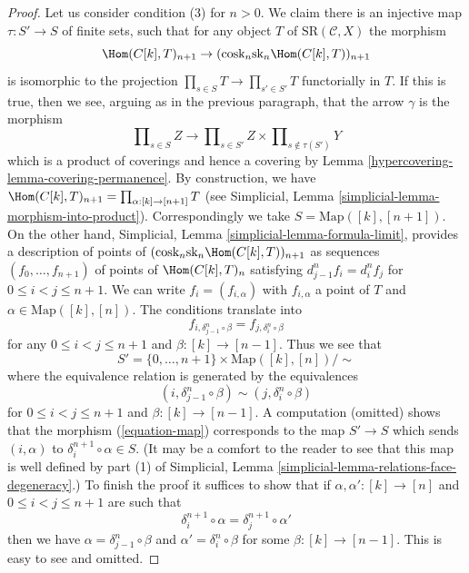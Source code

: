 \begin{proof}
\medskip\noindent
Let us consider condition (3) for $n > 0$. We claim there is an
injective map $\tau : S' \to S$ of finite sets, such that for any
object $T$ of $\text{SR}(\mathcal{C}, X)$ the morphism
\begin{equation}
\label{equation-map}
\Hom(C[k], T)_{n + 1} \to
(\text{cosk}_n \text{sk}_n \Hom(C[k], T))_{n + 1}
\end{equation}
is isomorphic to the projection $\prod_{s \in S} T \to \prod_{s' \in S'} T$
functorially in $T$. If this is true, then we see, arguing as in the previous
paragraph, that the arrow $\gamma$ is the morphism
$$
\prod\nolimits_{s \in S} Z
\longrightarrow
\prod\nolimits_{s \in S'} Z
\times
\prod\nolimits_{s \not\in \tau(S')} Y
$$
which is a product of coverings and hence a covering by
Lemma \ref{hypercovering-lemma-covering-permanence}. By construction, we have
$\Hom(C[k], T)_{n + 1} = \prod_{\alpha : [k] \to [n + 1]} T$
(see Simplicial, Lemma \ref{simplicial-lemma-morphism-into-product}).
Correspondingly we take $S = \text{Map}([k], [n + 1])$.
On the other hand, Simplicial, Lemma \ref{simplicial-lemma-formula-limit},
provides a description of points of
$(\text{cosk}_n \text{sk}_n \Hom(C[k], T))_{n + 1}$
as sequences $(f_0, \ldots, f_{n + 1})$ of points of $\Hom(C[k], T)_n$
satisfying $d^n_{j - 1} f_i = d^n_i f_j$ for $0 \leq i < j \leq n + 1$.
We can write $f_i = (f_{i, \alpha})$ with $f_{i, \alpha}$ a point of $T$
and $\alpha \in \text{Map}([k], [n])$. The conditions translate into
$$
f_{i, \delta^n_{j - 1} \circ \beta} = f_{j, \delta_i^n \circ \beta}
$$
for any $0 \leq i < j \leq n + 1$ and $\beta : [k] \to [n - 1]$. Thus we
see that
$$
S' = \{0, \ldots, n + 1\} \times \text{Map}([k], [n]) / \sim
$$
where the equivalence relation is generated by the equivalences
$$
(i, \delta^n_{j - 1} \circ \beta) \sim (j, \delta_i^n \circ \beta)
$$
for $0 \leq i < j \leq n + 1$ and $\beta : [k] \to [n - 1]$.
A computation (omitted) shows that the morphism (\ref{equation-map})
corresponds to the map $S' \to S$ which sends $(i, \alpha)$ to
$\delta^{n + 1}_i \circ \alpha \in S$. (It may be a comfort to the
reader to see that this map is well defined by part (1) of
Simplicial, Lemma \ref{simplicial-lemma-relations-face-degeneracy}.)
To finish the proof it suffices to show that if
$\alpha, \alpha' : [k] \to [n]$ and $0 \leq i < j \leq n + 1$
are such that
$$
\delta^{n + 1}_i \circ \alpha = \delta^{n + 1}_j \circ \alpha'
$$
then we have $\alpha = \delta^n_{j - 1} \circ \beta$
and $\alpha' = \delta_i^n \circ \beta$ for some $\beta : [k] \to [n - 1]$.
This is easy to see and omitted.
\end{proof}

